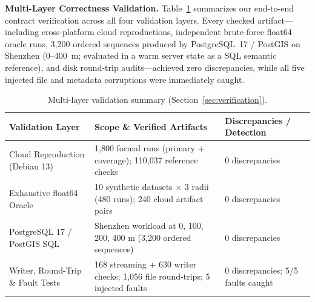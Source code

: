 \documentclass[sigconf, nonacm]{acmart}
\begin{document}
\textbf{Multi-Layer Correctness Validation.} Table~\ref{tab:validation} summarizes our end-to-end contract verification across all four validation layers. Every checked artifact---including cross-platform cloud reproductions, independent brute-force float64 oracle runs, 3{,}200 ordered sequences produced by PostgreSQL~17 / PostGIS on Shenzhen (0--400~m; evaluated in a warm server state as a SQL semantic reference), and disk round-trip audits---achieved zero discrepancies, while all five injected file and metadata corruptions were immediately caught.

\begin{table}[t]
\caption{Multi-layer validation summary (Section~\ref{sec:verification}).}
\label{tab:validation}\centering\small
\begin{tabular}{lll}\toprule
Validation Layer & Scope \& Verified Artifacts & Discrepancies / Detection\\\midrule
Cloud Reproduction (Debian 13) & 1{,}800 formal runs (primary + coverage); 110{,}037 reference checks & 0 discrepancies\\
Exhaustive float64 Oracle & 10 synthetic datasets $\times$ 3 radii (480 runs); 240 cloud artifact pairs & 0 discrepancies\\
PostgreSQL 17 / PostGIS SQL & Shenzhen workload at 0, 100, 200, 400 m (3{,}200 ordered sequences) & 0 discrepancies\\
Writer, Round-Trip \& Fault Tests & 168 streaming + 630 writer checks; 1{,}056 file round-trips; 5 injected faults & 0 discrepancies; 5/5 faults caught\\\bottomrule
\end{tabular}
\end{table}
\end{document}
